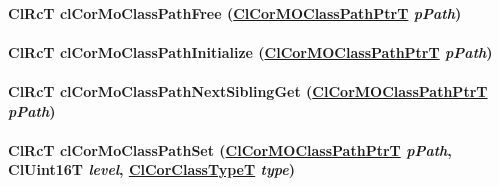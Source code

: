 \hypertarget{group__group13_ga97}{
\paragraph[clCorMoClassPathFree]{\setlength{\rightskip}{0pt plus 5cm}Cl\-Rc\-T cl\-Cor\-Mo\-Class\-Path\-Free (\hyperlink{struct_cl_cor_m_o_class_path}{Cl\-Cor\-MOClass\-Path\-Ptr\-T} {\em p\-Path})}\hfill}
\label{group__group13_ga97}


\hypertarget{group__group13_ga95}{
\paragraph[clCorMoClassPathInitialize]{\setlength{\rightskip}{0pt plus 5cm}Cl\-Rc\-T cl\-Cor\-Mo\-Class\-Path\-Initialize (\hyperlink{struct_cl_cor_m_o_class_path}{Cl\-Cor\-MOClass\-Path\-Ptr\-T} {\em p\-Path})}\hfill}
\label{group__group13_ga95}


\hypertarget{group__group13_ga104}{
\paragraph[clCorMoClassPathNextSiblingGet]{\setlength{\rightskip}{0pt plus 5cm}Cl\-Rc\-T cl\-Cor\-Mo\-Class\-Path\-Next\-Sibling\-Get (\hyperlink{struct_cl_cor_m_o_class_path}{Cl\-Cor\-MOClass\-Path\-Ptr\-T} {\em p\-Path})}\hfill}
\label{group__group13_ga104}


\hypertarget{group__group13_ga99}{
\paragraph[clCorMoClassPathSet]{\setlength{\rightskip}{0pt plus 5cm}Cl\-Rc\-T cl\-Cor\-Mo\-Class\-Path\-Set (\hyperlink{struct_cl_cor_m_o_class_path}{Cl\-Cor\-MOClass\-Path\-Ptr\-T} {\em p\-Path}, Cl\-Uint16T {\em level}, \hyperlink{group__group13_ga2}{Cl\-Cor\-Class\-Type\-T} {\em type})}\hfill}
\label{group__group13_ga99}


